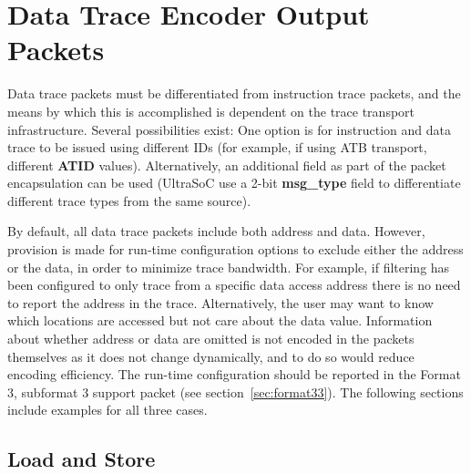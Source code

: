 \chapter{Data Trace Encoder Output Packets} \label{dataTracePackets}

Data trace packets must be differentiated from instruction trace packets, and the means by which
this is accomplished is dependent on the trace transport infrastructure.  Several possibilities exist:
One option is for instruction and data trace to be issued using different IDs (for example, if using ATB transport,
different \textbf{ATID} values).  Alternatively, an additional field as part of the packet encapsulation can be 
used (UltraSoC use a 2-bit \textbf{msg\_type} field to differentiate different trace types from the same source).

By default, all data trace packets include both address and data.  However, provision is made for run-time 
configuration options to exclude either the address or the data, in order to minimize trace bandwidth.  For example,
if filtering has been configured to only trace from a specific data access address there is no need to report
the address in the trace.  Alternatively, the user may want to know which locations are accessed but not care 
about the data value. Information about whether address or data are omitted is not encoded in the packets
themselves as it does not change dynamically, and to do so would reduce encoding efficiency.  The run-time
configuration should be reported in the Format 3, subformat 3 support packet (see section~\ref{sec:format33}).
The following sections include examples for all three cases.

\section{Load and Store} \label{sec:data-loadstore}

